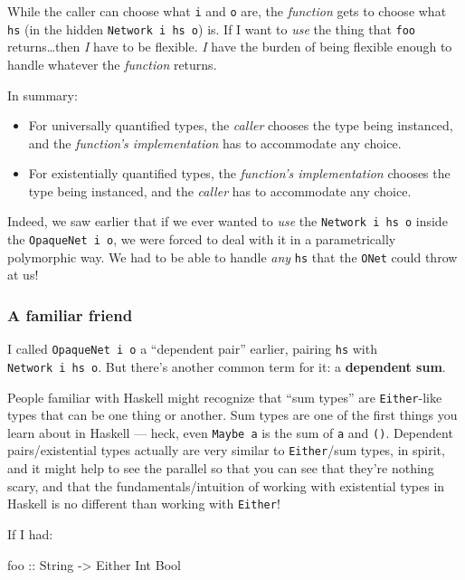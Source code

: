\documentclass[]{article}
\newenvironment{Shaded}{}{}
\newcommand{\DataTypeTok}[1]{\textcolor[rgb]{0.56,0.13,0.00}{{#1}}}
\newcommand{\OtherTok}[1]{\textcolor[rgb]{0.00,0.44,0.13}{{#1}}}
\begin{document}
While the caller can choose what \texttt{i} and \texttt{o} are, the
\emph{function} gets to choose what \texttt{hs} (in the hidden
\texttt{Network\ i\ hs\ o}) is. If I want to \emph{use} the thing that
\texttt{foo} returns\ldots{}then \emph{I} have to be flexible. \emph{I} have the
burden of being flexible enough to handle whatever the \emph{function} returns.

In summary:

\begin{itemize}
\item
  For universally quantified types, the \emph{caller} chooses the type being
  instanced, and the \emph{function's implementation} has to accommodate any
  choice.
\item
  For existentially quantified types, the \emph{function's implementation}
  chooses the type being instanced, and the \emph{caller} has to accommodate any
  choice.
\end{itemize}

Indeed, we saw earlier that if we ever wanted to \emph{use} the
\texttt{Network\ i\ hs\ o} inside the \texttt{OpaqueNet\ i\ o}, we were forced
to deal with it in a parametrically polymorphic way. We had to be able to handle
\emph{any} \texttt{hs} that the \texttt{ONet} could throw at us!

\subsubsection{A familiar friend}\label{a-familiar-friend}

I called \texttt{OpaqueNet\ i\ o} a ``dependent pair'' earlier, pairing
\texttt{hs} with \texttt{Network\ i\ hs\ o}. But there's another common term for
it: a \textbf{dependent sum}.

People familiar with Haskell might recognize that ``sum types'' are
\texttt{Either}-like types that can be one thing or another. Sum types are one
of the first things you learn about in Haskell --- heck, even \texttt{Maybe\ a}
is the sum of \texttt{a} and \texttt{()}. Dependent pairs/existential types
actually are very similar to \texttt{Either}/sum types, in spirit, and it might
help to see the parallel so that you can see that they're nothing scary, and
that the fundamentals/intuition of working with existential types in Haskell is
no different than working with \texttt{Either}!

If I had:

\begin{Shaded}
\begin{Highlighting}[]
\OtherTok{foo ::} \DataTypeTok{String} \OtherTok{->} \DataTypeTok{Either} \DataTypeTok{Int} \DataTypeTok{Bool}
\end{Highlighting}
\end{Shaded}
\end{document}
